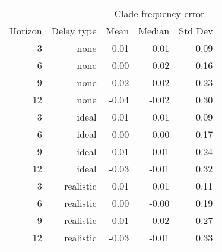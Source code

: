 
\begin{tabular*}{0.7\textwidth}{rrrrr}
\toprule
        &            & \multicolumn{3}{c}{Clade frequency error} \\
Horizon & Delay type & Mean & Median & Std Dev \\
\midrule

3 & none & 0.01 & 0.01 & 0.09 \\
6 & none & -0.00 & -0.02 & 0.16 \\
9 & none & -0.02 & -0.02 & 0.23 \\
12 & none & -0.04 & -0.02 & 0.30 \\
3 & ideal & 0.01 & 0.01 & 0.09 \\
6 & ideal & -0.00 & 0.00 & 0.17 \\
9 & ideal & -0.01 & -0.01 & 0.24 \\
12 & ideal & -0.03 & -0.01 & 0.32 \\
3 & realistic & 0.01 & 0.01 & 0.11 \\
6 & realistic & 0.00 & -0.00 & 0.19 \\
9 & realistic & -0.01 & -0.02 & 0.27 \\
12 & realistic & -0.03 & -0.01 & 0.33 \\

\bottomrule
\end{tabular*}

